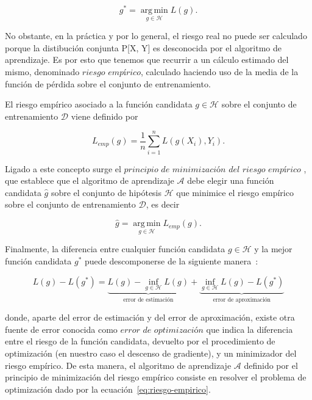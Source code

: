 \[ g^{*} = \operatorname*{\arg \,\min}_{g \in \mathcal{H}} L(g). \]\newline

No obstante, en la práctica y por lo general, el riesgo real no puede ser calculado porque la distibución conjunta P[X, Y] es desconocida por el algoritmo de aprendizaje. Es por esto que tenemos que recurrir a un cálculo estimado del mismo, denominado $\textit{riesgo empírico}$, calculado haciendo uso de la media de la función de pérdida sobre el conjunto de entrenamiento.\newline

\begin{definicion}\label{def:riesgo-empírico}
    El riesgo empírico asociado a la función candidata $g \in \mathcal{H}$ sobre el conjunto de entrenamiento $\mathcal{D}$ viene definido por

    \[ L_{emp}(g) = \frac{1}{n} \sum_{i=1}^{n}L(g(X_{i}), Y_{i}). \]\newline
\end{definicion}

Ligado a este concepto surge el $\textit{principio de minimización del riesgo empírico}$ \cite{Vapnik1991}, que establece que el algoritmo de aprendizaje $\mathcal{A}$ debe elegir una función candidata $\hat{g}$ sobre el conjunto de hipótesis $\mathcal{H}$ que minimice el riesgo empírico sobre el conjunto de entrenamiento $\mathcal{D}$, es decir

\begin{equation}\label{eq:riesgo-empirico}
    \hat{g} = \operatorname*{\arg \,\min}_{g \in \mathcal{H}} L_{emp}(g). 
\end{equation}\newline

Finalmente, la diferencia entre cualquier función candidata $g \in \mathcal{H}$ y la mejor función candidata $g^{*}$ puede descomponerse de la siguiente manera~\cite{Lafon2024}:

\[
L(g) - L(g^{*}) = \underbrace{L(g) - \inf_{g \in \mathcal{H}} L(g)}_{\text{error de estimación}} + \underbrace{\inf_{g \in \mathcal{H}} L(g) - L(g^{*})}_{\text{error de aproximación}}
\]

donde, aparte del error de estimación y del error de aproximación, existe otra fuente de error conocida como $\textit{error de optimización}$ que indica la diferencia entre el riesgo de la función candidata, devuelto por el procedimiento de optimización (en nuestro caso el descenso de gradiente), y un minimizador del riesgo empírico. De esta manera, el algoritmo de aprendizaje $\mathcal{A}$ definido por el principio de minimización del riesgo empírico consiste en resolver el problema de optimización dado por la ecuación~\eqref{eq:riesgo-empirico}.\newline

